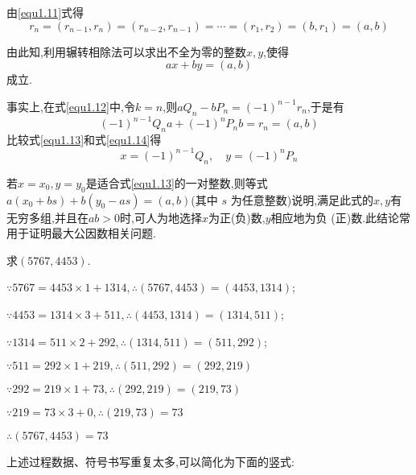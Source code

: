 \proof 由\eqref{equ1.11}式得
\begin{equation*}
	r_{n}=\left(r_{n-1}, r_{n}\right)=\left(r_{n-2}, r_{n-1}\right)=\cdots=\left(r_{1}, r_{2}\right)=\left(b, r_{1}\right)=(a, b)
\end{equation*}

\entry 由此知,利用辗转相除法可以求出不全为零的整数$x, y$,使得
\begin{equation}\label{equ1.13}
	a x+b y=(a, b)
\end{equation}
成立.

事实上,在式\eqref{equ1.12}中,令$k=n$,则$a Q_{n}-b P_{n}=(-1)^{n-1} r_{n}$,于是有
\begin{equation}\label{equ1.14}
	(-1)^{n-1} Q_{n} a+(-1)^{n} P_{n} b=r_{n}=(a, b)
\end{equation}
比较式\eqref{equ1.13}和式\eqref{equ1.14}得
\begin{equation*}
	x=(-1)^{n-1} Q_{n}, \quad y=(-1)^{n} P_{n}
\end{equation*}

\remark 若$x=x_{0}, y=y_{0}$是适合式\eqref{equ1.13}的一对整数,则等式$a\left(x_{0}+b s\right)+b\left(y_{0}-a s\right)=(a, b)$(其中 $s$ 为任意整数)说明,满足此式的$x, y$有无穷多组,并且在$a b>0$时,可人为地选择$x$为正(负)数,$y$相应地为负 (正)数.此结论常用于证明最大公因数相关问题.

\example 求$(5767,4453)$.

\solve $\because 5767=4453 \times 1+1314, \therefore(5767,4453)=(4453,1314)$;

$\because 4453=1314 \times 3+511, \therefore(4453,1314)=(1314,511)$;

$\because 1314=511 \times 2+292, \therefore(1314,511)=(511,292)$;

$\because 511=292 \times 1+219, \therefore(511,292)=(292,219)$

$\because 292=219 \times 1+73, \therefore(292,219)=(219,73)$

$\because 219=73 \times 3+0, \therefore(219,73)=73$

$\therefore(5767,4453)=73$

上述过程数据、符号书写重复太多,可以简化为下面的竖式:

